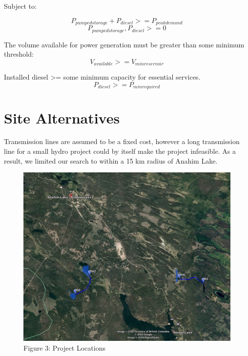 \documentclass[11pt]{article}
\makeatletter
\def\maxwidth{\ifdim\Gin@nat@width>\linewidth\linewidth
    \else\Gin@nat@width\fi}
\let\Oldincludegraphics\includegraphics
\renewcommand{\includegraphics}[1]{\Oldincludegraphics[width=.8\maxwidth]{#1}}
\makeatother
\begin{document}
Subject to:

\[P_{pumped storage} + P_{diesel} >= P_{peak demand}\]
\[P_{pumped storage}, P_{diesel} >= 0\]

The volume available for power generation must be greater than some
minimum threshold: \[V_{available} >= V_{min reservoir}\]

Installed diesel \textgreater{}= some minimum capacity for essential
services. \[P_{diesel} >= P_{min required}\]

    \hypertarget{site-alternatives}{%
\section{Site Alternatives}\label{site-alternatives}}

Transmission lines are assumed to be a fixed cost, however a long
transmission line for a small hydro project could by itself make the
project infeasible. As a result, we limited our search to within a 15 km
radius of Anahim Lake.

\begin{figure}
\centering
\includegraphics{images/Project_GA.jpg}
\caption{Figure 3: Project Locations}
\end{figure}
\end{document}
